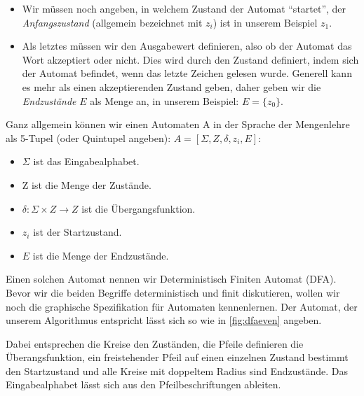 \begin{itemize}
    \item Wir müssen noch angeben, in welchem Zustand der Automat ``startet'',
        der \emph{Anfangszustand} (allgemein bezeichnet mit $z_i$)
        ist in unserem Beispiel $z_1$.

    \item Als letztes müssen wir den Ausgabewert definieren,
        also ob der Automat das Wort akzeptiert oder nicht.
        Dies wird durch den Zustand definiert, indem sich der Automat
        befindet, wenn das letzte Zeichen gelesen wurde.
        Generell kann es mehr als einen akzeptierenden Zustand geben,
        daher geben wir die \emph{Endzustände} $E$ als Menge an,
        in unserem Beispiel: $E = \{z_0\}$.
\end{itemize}

Ganz allgemein können wir einen Automaten A in der Sprache der Mengenlehre
als 5-Tupel (oder Quintupel angeben): $A = [\Sigma, Z, \delta, z_i, E]$:
\begin{itemize}
    \item $\Sigma$ ist das Eingabealphabet.
    \item Z ist die Menge der Zustände.
    \item $\delta: \Sigma \times Z \rightarrow Z$ ist die Übergangsfunktion.
    \item $z_i$ ist der Startzustand.
    \item $E$ ist die Menge der Endzustände.
\end{itemize}
Einen solchen Automat nennen wir Deterministisch Finiten Automat (DFA).
Bevor wir die beiden Begriffe deterministisch und finit diskutieren,
wollen wir noch die graphische Spezifikation für Automaten kennenlernen. 
Der Automat,
der unserem Algorithmus entspricht lässt sich so wie in \autoref{fig:dfaeven} angeben.


Dabei entsprechen die Kreise den Zuständen,
die Pfeile definieren die Überangsfunktion,
ein freistehender Pfeil auf einen einzelnen Zustand bestimmt den Startzustand
und alle Kreise mit doppeltem Radius sind Endzustände.
Das Eingabealphabet lässt sich aus den Pfeilbeschriftungen ableiten.

